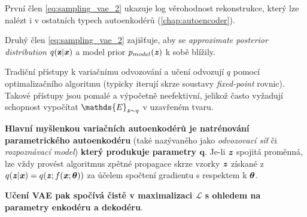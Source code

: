 První člen \autoref{eq:sampling_vae_2} ukazuje log věrohodnost rekonstrukce, který lze nalézt i v ostatních typech autoenkodérů (\autoref{chap:autoencoder}). 

Druhý člen \autoref{eq:sampling_vae_2} zajišťuje, aby se \emph{approximate posterior distribution} $q(\textbf{z}\mid\textbf{\emph{x}})$ a model prior $p_{model}(\textbf{\emph{z}})$ k sobě blížily. \cite{Goodfellow2016}

Tradiční přístupy k variačnímu odvozování a učení odvozují $q$ pomocí optimalizačního algoritmu (typicky iterují skrze soustavy \emph{fixed-point} rovnic).
Takové přístupy jsou pomalé a výpočetně neefektivní, jelikož často vyžadují schopnost vypočítat $\mathds{E}_{\textbf{\emph{z}} \sim q}$ v uzavřeném tvaru. \cite{Goodfellow2016}

\textbf{Hlavní myšlenkou variačních autoenkodérů je natrénování parametrického autoenkodéru} (také nazývaného jako \emph{odvozovací síť} či \emph{rozpoznávací model}) \textbf{který produkuje parametry $\textbf{q}$}.
Je-li $\textbf{\emph{z}}$ spojitá proměnná, lze vždy provést algoritmus zpětné propagace skrze vzorky $\textbf{\emph{z}}$ získané z $q(\textbf{\emph{z}}\mid\textbf{\emph{x}}) = q(\textbf{\emph{z}};f(\textbf{\emph{x}}; \bm{\emph{$\theta$}}))$ za účelem spočtení gradientu s respektem k $\bm{\emph{$\theta$}}$. \cite{Goodfellow2016}

\textbf{Učení VAE pak spočívá čistě v maximalizaci $\mathcal{L}$ s ohledem na parametry enkodéru a dekodéru}. \cite{Kingma2014}